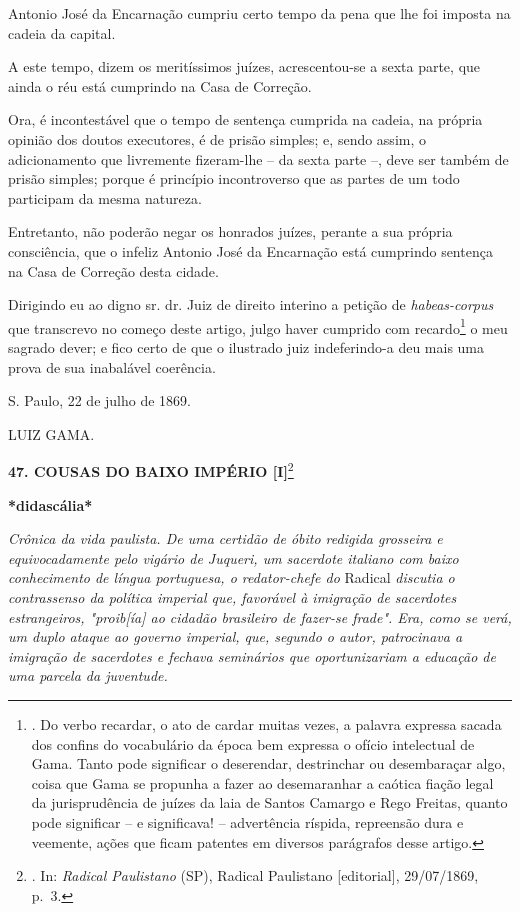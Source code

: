 Antonio José da Encarnação cumpriu certo tempo da pena que lhe foi
imposta na cadeia da capital.

A este tempo, dizem os meritíssimos juízes, acrescentou-se a sexta
parte, que ainda o réu está cumprindo na Casa de Correção.

Ora, é incontestável que o tempo de sentença cumprida na cadeia, na
própria opinião dos doutos executores, é de prisão simples; e, sendo
assim, o adicionamento que livremente fizeram-lhe -- da sexta parte --,
deve ser também de prisão simples; porque é princípio incontroverso que
as partes de um todo participam da mesma natureza.

Entretanto, não poderão negar os honrados juízes, perante a sua própria
consciência, que o infeliz Antonio José da Encarnação está cumprindo
sentença na Casa de Correção desta cidade.

Dirigindo eu ao digno sr. dr. Juiz de direito interino a petição de
\emph{habeas-corpus} que transcrevo no começo deste artigo, julgo haver
cumprido com recardo\footnote{. Do verbo recardar, o ato de cardar
  muitas vezes, a palavra expressa sacada dos confins do vocabulário da
  época bem expressa o ofício intelectual de Gama. Tanto pode significar
  o deserendar, destrinchar ou desembaraçar algo, coisa que Gama se
  propunha a fazer ao desemaranhar a caótica fiação legal da
  jurisprudência de juízes da laia de Santos Camargo e Rego Freitas,
  quanto pode significar -- e significava! -- advertência ríspida,
  repreensão dura e veemente, ações que ficam patentes em diversos
  parágrafos desse artigo.} o meu sagrado dever; e fico certo de que o
ilustrado juiz indeferindo-a deu mais uma prova de sua inabalável
coerência.

S. Paulo, 22 de julho de 1869.

LUIZ GAMA.

\textbf{47. COUSAS DO BAIXO IMPÉRIO {[}I{]}}\footnote{. In:
  \emph{Radical Paulistano} (SP), Radical Paulistano {[}editorial{]},
  29/07/1869, p.~3.}

\textbf{*didascália*}

\emph{Crônica da vida paulista. De uma certidão de óbito redigida
grosseira e equivocadamente pelo vigário de Juqueri, um sacerdote
italiano com baixo conhecimento de língua portuguesa, o redator-chefe
do} Radical \emph{discutia o contrassenso da política imperial que,
favorável à imigração de sacerdotes estrangeiros, "proib{[}ía{]} ao
cidadão brasileiro de fazer-se frade". Era, como se verá, um duplo
ataque ao governo imperial, que, segundo o autor, patrocinava a
imigração de sacerdotes e fechava seminários que oportunizariam a
educação de uma parcela da juventude.}

